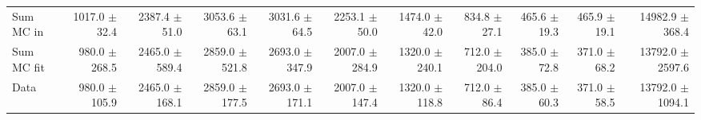 \begin{table}[htbp]
{\begin{tabular}{lrrrrrrrrrr}
\hline
Sum MC in & 1017.0 $\pm$ 32.4 & 2387.4 $\pm$ 51.0 & 3053.6 $\pm$ 63.1 & 3031.6 $\pm$ 64.5 & 2253.1 $\pm$ 50.0 & 1474.0 $\pm$ 42.0 & 834.8 $\pm$ 27.1 & 465.6 $\pm$ 19.3 & 465.9 $\pm$ 19.1& 14982.9 $\pm$ 368.4 \\
Sum MC fit & 980.0 $\pm$ 268.5 & 2465.0 $\pm$ 589.4 & 2859.0 $\pm$ 521.8 & 2693.0 $\pm$ 347.9 & 2007.0 $\pm$ 284.9 & 1320.0 $\pm$ 240.1 & 712.0 $\pm$ 204.0 & 385.0 $\pm$ 72.8 & 371.0 $\pm$ 68.2 & 13792.0 $\pm$ 2597.6 \\
\hline
Data & 980.0 $\pm$ 105.9 & 2465.0 $\pm$ 168.1 & 2859.0 $\pm$ 177.5 & 2693.0 $\pm$ 171.1 & 2007.0 $\pm$ 147.4 & 1320.0 $\pm$ 118.8 & 712.0 $\pm$ 86.4 & 385.0 $\pm$ 60.3 & 371.0 $\pm$ 58.5 & 13792.0 $\pm$ 1094.1 \\
\hline
\end{tabular}
}
\end{table}
